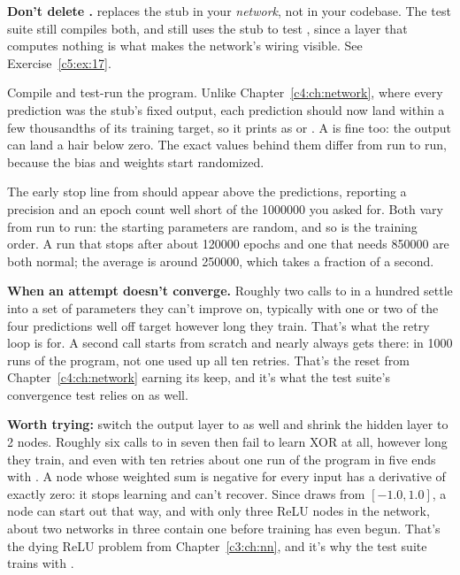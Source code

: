 \textbf{Don't delete .}  replaces the stub in your \emph{network}, not
in your codebase. The test suite still compiles both, and still uses the stub to test
, since a layer that computes nothing is what makes the network's wiring visible. See
Exercise~\ref{c5:ex:17}.

Compile and test-run the program. Unlike Chapter~\ref{c4:ch:network}, where every prediction was
the stub's fixed output, each prediction should now land within a few thousandths of its training
target, so it prints as  or . A  is fine too: the 
output can land a hair below zero. The exact values behind them differ from run to
run, because the bias and weights start randomized.

The early stop line from  should appear above the predictions, reporting a precision
and an epoch count well short of the 1000000 you asked for. Both vary from run to run: the starting
parameters are random, and so is the training order. A run that stops after about 120000 epochs and
one that needs 850000 are both normal; the average is around 250000, which takes a fraction of a
second.

\textbf{When an attempt doesn't converge.} Roughly two calls to  in a hundred settle
into a set of parameters they can't improve on, typically with one or two of the four predictions
well off target however long they train. That's what the retry loop is for. A second call starts
from scratch and nearly always gets there: in 1000 runs of the program, not one used up all ten
retries. That's
the reset from Chapter~\ref{c4:ch:network} earning its keep, and it's what the test suite's
convergence test relies on as well.

\textbf{Worth trying:} switch the output layer to  as well and shrink the
hidden layer to 2 nodes. Roughly six calls to  in seven then fail to learn XOR at
all, however long they train, and even with ten retries about one run of the program in five ends
with . A node whose weighted sum is negative for every input
has a derivative of exactly zero: it stops learning and can't recover. Since
 draws from $[-1.0, 1.0]$, a node can start out that way, and with only
three ReLU nodes in the network, about two networks in three contain one before training has even
begun. That's the dying ReLU problem from Chapter~\ref{c3:ch:nn}, and it's why the test suite
trains with .

